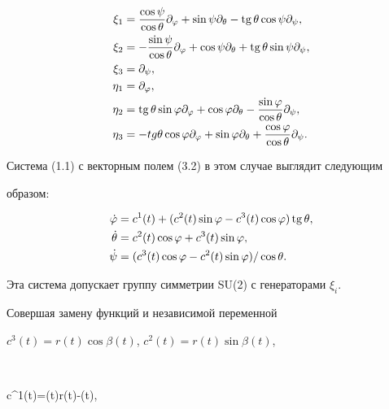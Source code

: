 \begin{align*} 


\xi_1&=\frac{\cos\psi}{\cos\theta}\partial_\varphi+ 


\sin\psi\partial_\theta-\tg\theta\cos\psi\partial_\psi,\\ 


\xi_2&=-\frac{\sin\psi}{\cos\theta}\partial_\varphi+ 


\cos\psi\partial_\theta+\tg\theta\sin\psi\partial_\psi,\\ 


\xi_3&=\partial_\psi,\\ 


\eta_1&=\partial_\varphi,\\ 


\eta_2&=\tg\theta\sin\varphi\partial_\varphi+ 


\cos\varphi\partial_\theta-\frac{\sin\varphi}{\cos\theta} 


\partial_\psi,\\ 


\eta_3&=-tg\theta\cos\varphi\partial_\varphi+ 


\sin\varphi\partial_\theta+\frac{\cos\varphi}{\cos\theta} 


\partial_\psi. 


\end{align*} 


Система (1.1) с векторным полем (3.2) в этом случае выглядит следующим 


образом: 


\begin{align*} 


\Dot\varphi&=c^1(t)+(c^2(t)\sin\varphi-c^3(t)\cos\varphi)\tg\theta,\\ 


\Dot\theta&=c^2(t)\cos\varphi+c^3(t)\sin\varphi,\\ 


\Dot\psi&=(c^3(t)\cos\varphi-c^2(t)\sin\varphi)/\cos\theta. 


\end{align*} 


Эта система допускает группу симметрии SU(2) с генераторами $\xi_i$. 


Совершая замену функций и независимой переменной 


$c^3(t)=r(t)\cos\beta(t)$, $c^2(t)=r(t)\sin\beta(t)$, 


$$ 


c^1(t)=\alpha(t)r(t)-\Dot\beta(t),\quad 


